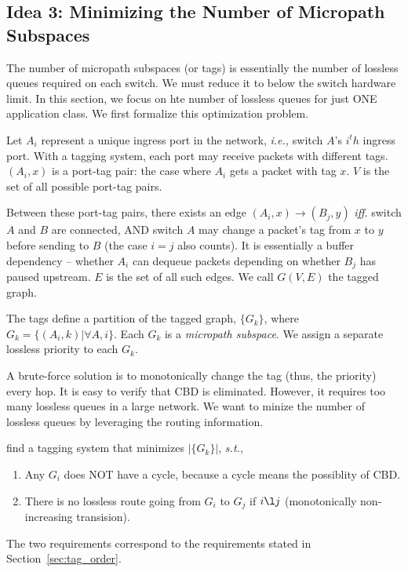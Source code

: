 \subsection{Idea 3: Minimizing the Number of Micropath Subspaces} 
The number of micropath subspaces (or tags) is essentially the number of lossless queues required on each switch.
We must reduce it to below the switch hardware limit. In this section, we focus on hte number of lossless queues for 
just ONE application class. We first formalize this optimization problem.

 Let $A_i$ represent a unique ingress port in the network, {\em i.e.,} switch $A$'s $i^th$ ingress port.
With a tagging system, each port may receive packets with different tags.
$(A_i, x)$ is a port-tag pair: the case where $A_i$ gets a packet with tag $x$.
$V$ is the set of all possible port-tag pairs. 

Between these port-tag pairs, there exists an edge $(A_i, x)\rightarrow(B_j, y)$ {\em iff.} switch $A$ and $B$ are 
connected, AND switch $A$ may change a packet's tag from $x$ to $y$ before sending to $B$ (the case $i=j$ also counts).
It is essentially a buffer dependency -- whether $A_i$ can dequeue packets depending on whether $B_j$ has paused upstream.
$E$ is the set of all such edges. We call $G(V, E)$ the tagged graph.

The tags define a partition of the tagged graph, $\{G_k\}$, where $G_k = \{(A_i, k) | \forall A, i\}$.
Each $G_k$ is a {\em micropath subspace}. We assign a separate lossless priority to each $G_k$.

A brute-force solution is to monotonically change the tag (thus, the priority) every hop.
It is easy to verify that CBD is eliminated. However, it requires too many lossless queues in a large network.
We want to minize the number of lossless queues by leveraging the routing information.

 find a tagging system that minimizes $|\{G_k\}|$, {\em s.t.,}
\begin{enumerate}
\item Any $G_i$ does NOT have a cycle, because a cycle means the possiblity of CBD.
\item There is no lossless route going from $G_i$ to $G_j$ if $i \l j$ (monotonically non-increasing transision).
\end{enumerate}

The two requirements correspond to the requirements stated in Section~\ref{sec:tag_order}.

